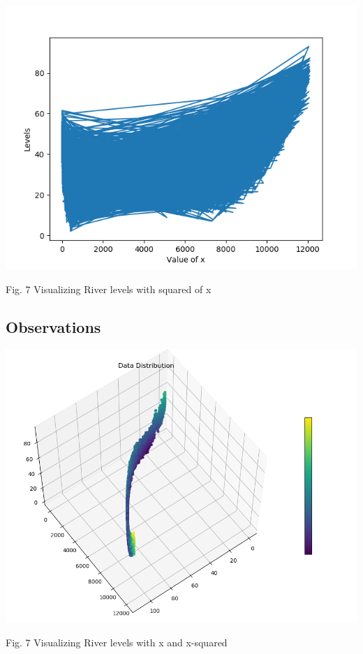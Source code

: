 \documentclass[12pt,journal,compsoc]{IEEEtran}
\begin{document}
\begin{center}
\includegraphics[scale=0.35]{River_dataset_squared.png}

{\small Fig. 7 Visualizing River levels with squared of x}
\end{center}

\subsection{Observations}

\begin{center}
\includegraphics[scale=0.35]{3D.png}

{\small Fig. 7 Visualizing River levels with x and x-squared}
\end{center}
\end{document}
